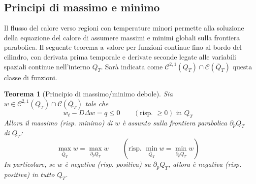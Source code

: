 \documentclass[a4paper,12pt, draft]{article}
\theoremstyle{break}
\newtheorem{theorem}{Teorema}[section]
\numberwithin{equation}{section}
\begin{document}
\subsection{Principi di massimo e minimo}
Il flusso del calore verso regioni con temperature minori permette alla soluzione della equazione del calore di assumere massimi e minimi globali sulla frontiera parabolica. Il seguente teorema a valore per funzioni continue fino al bordo del cilindro, con derivata prima temporale e derivate seconde legate alle variabili spaziali continue nell'interno $Q_T$. Sarà indicata come $\mathcal{C}^{2,1}(Q_T)\cap \mathcal{C}(\overline{Q}_T)$ questa classe di funzioni.
\begin{theorem}[Principio di massimo/minimo debole]
Sia $w \in \mathcal{C}^{2,1}(Q_T)\cap \mathcal{C}(\overline{Q}_T)$ tale che
$$
w_t - D\Delta w = q \leq 0 \qquad (\mbox{risp. } \geq 0) \mbox{ in }Q_T
$$
Allora il massimo (risp. minimo) di $w$ è assunto sulla frontiera parabolica $\partial_p Q_T$ di $Q_T$:
$$
\max_{\overline{Q}_T}w = \max_{\partial_p Q_T}w \qquad (\mbox{risp. } \min_{\overline{Q}_T}w = \min_{\partial_p Q_T}w)
$$
In particolare, se $w$ è negativa (risp. positiva) su $\partial_p Q_T$, allora è negativa (risp. positiva) in tutto $\overline{Q}_T$.
\end{theorem}
\end{document}
